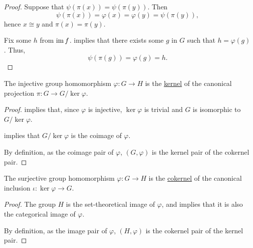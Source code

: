 \begin{proof}
   Suppose that \( \psi(\pi(x)) = \psi(\pi(y)) \). Then
  \begin{equation*}
    \psi(\pi(x)) = \varphi(x) = \varphi(y) = \psi(\pi(y)),
  \end{equation*}
  hence \( x \cong y \) and \( \pi(x) = \pi(y) \).

   Fix some \( h \) from \( \operatorname{im} f \).  implies that there exists some \( g \) in \( G \) such that \( h = \varphi(g) \). Thus,
  \begin{equation*}
    \psi(\pi(g)) = \varphi(g) = h.
  \end{equation*}
\end{proof}

\begin{corollary}\label{thm:injective_group_homomorphisms_are_kernels}
  The injective group homomorphism \( \varphi: G \to H \) is the \hyperref[def:zero_morphisms/kernel]{kernel} of the canonical projection \( \pi: G \to G / \ker \varphi \).
\end{corollary}
\begin{proof}
   implies that, since \( \varphi \) is injective, \( \ker \varphi \) is trivial and \( G \) is isomorphic to \( G / \ker \varphi \).

   implies that \( G / \ker \varphi \) is the coimage of \( \varphi \).

  By definition, as the coimage pair of \( \varphi \), \( (G, \varphi) \) is the kernel pair of the cokernel pair.
\end{proof}

\begin{corollary}\label{thm:surjective_group_homomorphisms_are_cokernels}
  The surjective group homomorphism \( \varphi: G \to H \) is the \hyperref[def:zero_morphisms/cokernel]{cokernel} of the canonical inclusion \( \iota: \ker \varphi \to G \).
\end{corollary}
\begin{proof}
  The group \( H \) is the set-theoretical image of \( \varphi \), and  implies that it is also the categorical image of \( \varphi \).

  By definition, as the image pair of \( \varphi \), \( (H, \varphi) \) is the cokernel pair of the kernel pair.
\end{proof}


